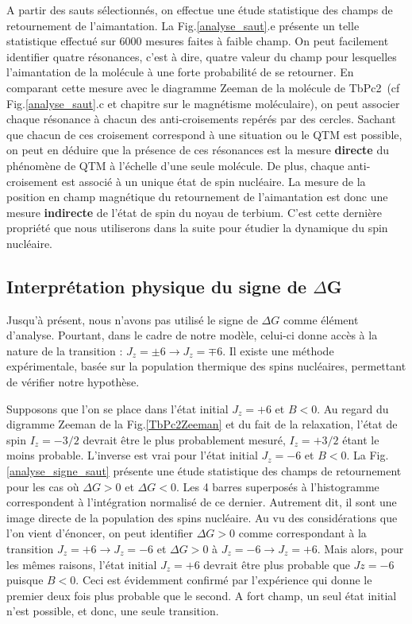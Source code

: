 A partir des sauts sélectionnés, on effectue une étude statistique des champs de retournement de l'aimantation. La Fig.\ref{analyse_saut}.e présente un telle statistique effectué sur 6000 mesures faites à faible champ. On peut facilement identifier quatre résonances, c'est à dire, quatre valeur du champ pour lesquelles l'aimantation de la molécule à une forte probabilité de se retourner. En comparant cette mesure avec le diagramme Zeeman de la molécule de TbPc2~(cf Fig.\ref{analyse_saut}.c et chapitre sur le magnétisme moléculaire), on peut associer chaque résonance à chacun des anti-croisements repérés par des cercles. Sachant que chacun de ces croisement correspond à une situation ou le QTM est possible, on peut en déduire que la présence de ces résonances est la mesure \textbf{directe} du phénomène de QTM à l'échelle d'une seule molécule. De plus, chaque anti-croisement est associé à un unique état de spin nucléaire. La mesure de la position en champ magnétique du retournement de l'aimantation est donc une mesure \textbf{indirecte} de l'état de spin du noyau de terbium. C'est cette dernière propriété que nous utiliserons dans la suite pour étudier la dynamique du spin nucléaire.


\subsection{Interprétation physique du signe de $\Delta$G}
Jusqu'à présent, nous n'avons pas utilisé le signe de $\Delta G$ comme élément d'analyse. Pourtant, dans le cadre de notre modèle, celui-ci donne accès à la nature de la transition : $J_z = \pm6 \rightarrow J_z = \mp 6$. Il existe une méthode expérimentale, basée sur la population thermique des spins nucléaires, permettant de vérifier notre hypothèse.

Supposons que l'on se place dans l'état initial $J_z=+6$ et $B<0$. Au regard du digramme Zeeman de la Fig.\ref{TbPc2Zeeman} et du fait de la relaxation, l'état de spin $I_z = -3/2$ devrait être le plus probablement mesuré, $I_z = +3/2$ étant le moins probable. L'inverse est vrai pour l'état initial $J_z=-6$ et $B<0$. La Fig.\ref{analyse_signe_saut} présente une étude statistique des champs de retournement pour les cas où $\Delta G> 0$ et $\Delta G< 0$. Les 4 barres superposés à l'histogramme correspondent à l'intégration normalisé de ce dernier. Autrement dit, il sont une image directe de la population des spins nucléaire. Au vu des considérations que l'on vient d'énoncer, on peut identifier $\Delta G> 0$ comme correspondant à la transition $J_z = +6 \rightarrow J_z =  - 6$ et $\Delta G> 0$ à $J_z = -6 \rightarrow J_z =  + 6$. Mais alors, pour les mêmes raisons, l'état initial $J_z=+6$ devrait être plus probable que $Jz=-6$ puisque $B<0$. Ceci est évidemment confirmé par l'expérience qui donne le premier deux fois plus probable que le second. A fort champ, un seul état initial n'est possible, et donc, une seule transition. 

